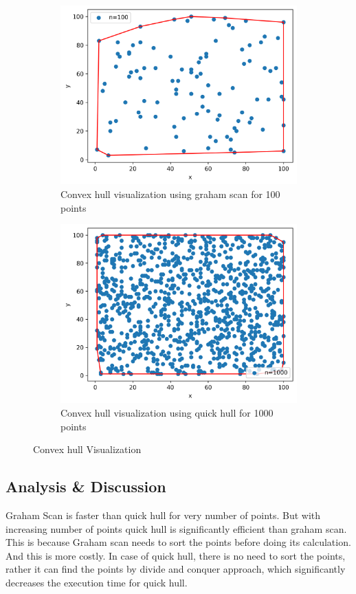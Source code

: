 \begin{figure}[H]
    \centering
    \begin{subfigure}[b]{0.5\textwidth}
        \centering
        \includegraphics[width=\textwidth]{./img/lab2/convex_100pt.png}
        \caption{Convex hull visualization using graham scan for 100 points}
    \end{subfigure}
    \hfill
    \begin{subfigure}[b]{0.5\textwidth}
        \centering
        \includegraphics[width=\textwidth]{./img/lab2/convex_1kpt.png}
        \caption{Convex hull visualization using quick hull for 1000 points}
    \end{subfigure}
    
    \caption{Convex hull Visualization}
    \label{fig:task2}
\end{figure}
\subsection{Analysis \& Discussion}
Graham Scan is faster than quick hull for very number of points. 
But with increasing number of points quick hull is significantly efficient
than graham scan. 
This is because Graham scan needs to sort the points before doing its
calculation. And this is more costly. 
In case of quick hull, there is no need to sort the points, rather it can find 
the points by divide and conquer approach, which significantly decreases 
the execution time for quick hull.
